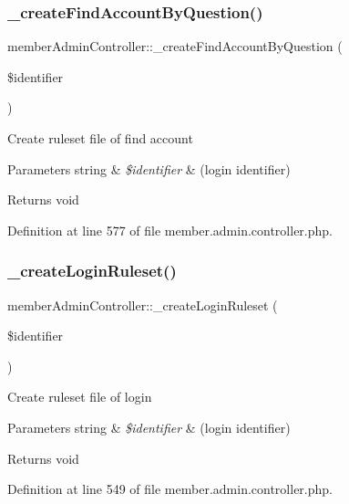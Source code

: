 \subsubsection{\texorpdfstring{\+\_\+create\+Find\+Account\+By\+Question()}{\_createFindAccountByQuestion()}}
{\footnotesize\ttfamily member\+Admin\+Controller\+::\+\_\+create\+Find\+Account\+By\+Question (\begin{DoxyParamCaption}\item[{}]{\$identifier }\end{DoxyParamCaption})}

Create ruleset file of find account 
\begin{DoxyParams}[1]{Parameters}
string & {\em \$identifier} & (login identifier) \\
\hline
\end{DoxyParams}
\begin{DoxyReturn}{Returns}
void 
\end{DoxyReturn}


Definition at line 577 of file member.\+admin.\+controller.\+php.

\hypertarget{classmemberAdminController_ad9823f9a79e8a26a39d912bcd888e301}{}\label{classmemberAdminController_ad9823f9a79e8a26a39d912bcd888e301} 
\subsubsection{\texorpdfstring{\+\_\+create\+Login\+Ruleset()}{\_createLoginRuleset()}}
{\footnotesize\ttfamily member\+Admin\+Controller\+::\+\_\+create\+Login\+Ruleset (\begin{DoxyParamCaption}\item[{}]{\$identifier }\end{DoxyParamCaption})}

Create ruleset file of login 
\begin{DoxyParams}[1]{Parameters}
string & {\em \$identifier} & (login identifier) \\
\hline
\end{DoxyParams}
\begin{DoxyReturn}{Returns}
void 
\end{DoxyReturn}


Definition at line 549 of file member.\+admin.\+controller.\+php.

